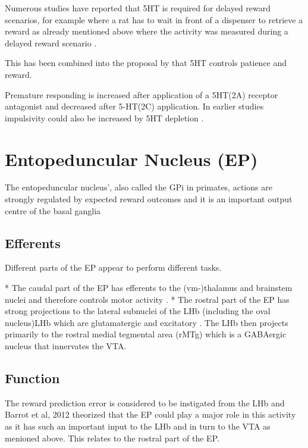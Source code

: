 \documentclass[12pt,a4paper]{article}
\begin{document}
Numerous studies have reported that 5HT is required for delayed reward scenarios, for example where a rat has to wait in front of a dispenser to retrieve a reward \citep{Khani2016} as already mentioned above where the activity was measured during a delayed reward scenario \citep{Li2016}.

This has been combined into the proposal by \citep{Miyazaki2012} that 5HT controls patience and reward.

Premature responding is increased after \citep{Fletcher2007} application of a 5HT(2A) receptor antagonist and decreased after 5-HT(2C) application. In earlier studies impulsivity could also be increased by 5HT depletion \citep{Harrison1997}.







\section{Entopeduncular Nucleus (EP)}

The entopeduncular nucleus’, also called the GPi in primates, actions are
strongly regulated by expected reward outcomes and it is an important output centre of the basal ganglia \citep{Rajakumar1993} 

\subsection{Efferents}

Different parts of the EP appear to perform different tasks. 

  * The caudal part of the EP has efferents to the (vm-)thalamus and brainstem nuclei and therefore controls motor activity \citep{Rajakumar1993}  \citep{Wallace2017}.
  * The rostral part of the EP has strong projections to the lateral subnuclei of the LHb (including the oval nucleus)LHb \citep{Rajakumar1993}\citep{Hong2008} which are glutamatergic and excitatory \citep{Shabel2012} \citep{Wallace2017}. The LHb then projects primarily to the rostral medial tegmental area (rMTg) which is a GABAergic nucleus that innervates the VTA.

\subsection{Function}

The reward prediction error is considered to be instigated from the LHb and Barrot et al, 2012 theorized that the EP could play a major role in this activity as it has such an important input to the LHb \citep{Barrot2012} and in turn to the VTA as menioned above. This relates to the rostral part of the EP.
\end{document}
